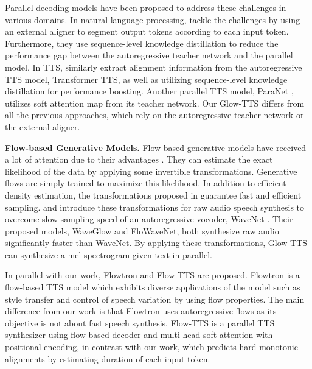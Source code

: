 \documentclass{article}
\begin{document}
Parallel decoding models have been proposed to address these challenges in various domains. In natural language processing, \citet{gu2017non} tackle the challenges by using an external aligner to segment output tokens according to each input token. Furthermore, they use sequence-level knowledge distillation \cite{kim2016sequence} to reduce the performance gap between the autoregressive teacher network and the parallel model. In TTS, \citet{ren2019fastspeech} similarly extract alignment information from the autoregressive TTS model, Transformer TTS, as well as utilizing sequence-level knowledge distillation for performance boosting. Another parallel TTS model, ParaNet \cite{peng2019parallel}, utilizes soft attention map from its teacher network. Our Glow-TTS differs from all the previous approaches, which rely on the autoregressive teacher network or the external aligner. 

\textbf{Flow-based Generative Models.} Flow-based generative models have received a lot of attention due to their advantages \cite{hoogeboom2019emerging,durkan2019neural,serra2019blow}. They can estimate the exact likelihood of the data by applying some invertible transformations. Generative flows are simply trained to maximize this likelihood. In addition to efficient density estimation, the transformations proposed in \cite{dinh2014nice,dinh2016density,kingma2018glow} guarantee fast and efficient sampling. \citet{prenger2019waveglow} and \citet{kimflowavenet} introduce these transformations for raw audio speech synthesis to overcome slow sampling speed of an autoregressive vocoder, WaveNet \cite{van2016wavenet}. Their proposed models, WaveGlow and FloWaveNet, both synthesize raw audio significantly faster than WaveNet. By applying these transformations, Glow-TTS can synthesize a mel-spectrogram given text in parallel. 

In parallel with our work, Flowtron \cite{valle2020flowtron} and Flow-TTS \cite{miao2020flow} are proposed. Flowtron is a flow-based TTS model which exhibits diverse applications of the model such as style transfer and control of speech variation by using flow properties. The main difference from our work is that Flowtron uses autoregressive flows as its objective is not about fast speech synthesis. Flow-TTS is a parallel TTS synthesizer using flow-based decoder and multi-head soft attention with positional encoding, in contrast with our work, which predicts hard monotonic alignments by estimating duration of each input token.
\end{document}
